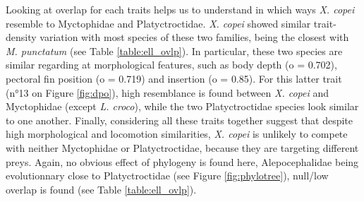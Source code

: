Looking at overlap for each traits helps us to understand in which ways \textit{X. copei} resemble to Myctophidae and Platyctroctidae. \textit{X. copei} showed similar trait-density variation with most species of these two families, being the closest with \textit{M. punctatum} (see Table \ref{table:ell_ovlp}). In particular, these two species are similar regarding at morphological features, such as body depth (o = 0.702), pectoral fin position (o = 0.719) and insertion (o = 0.85). For this latter trait (n°13 on Figure \ref{fig:dpo}), high resemblance is found between \textit{X. copei} and Myctophidae (except \textit{L. croco}), while the two Platyctroctidae species look similar to one another. Finally, considering all these traits together suggest that despite high morphological and locomotion similarities, \textit{X. copei} is unlikely to compete with neither Myctophidae or Platyctroctidae, because they are targeting different preys. Again, no obvious effect of phylogeny is found here, Alepocephalidae being evolutionnary close to Platyctroctidae (see Figure \ref{fig:phylotree}), null/low overlap is found (see Table \ref{table:ell_ovlp}). \\







